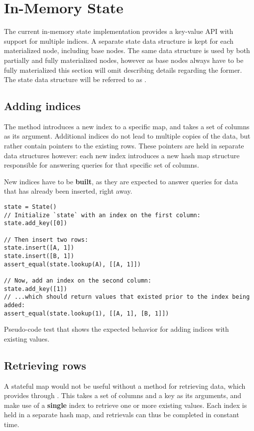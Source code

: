 \section{In-Memory State}\label{sec:in-memory-state}
The current in-memory state implementation provides a key-value API with support
for multiple indices. A separate state data structure is kept for each
materialized node, including base nodes. The same data structure is used by both
partially and fully materialized nodes, however as base nodes always have to be
fully materialized this section will omit describing details regarding the
former. The state data structure will be referred to as .

\subsection{Adding indices}
The  method introduces a new index to a specific  map,
and takes a set of columns as its argument. Additional indices do not lead to
multiple copies of the data, but rather contain pointers to the existing rows.
These pointers are held in separate data structures however: each new index
introduces a new hash map structure responsible for answering queries for that
specific set of columns.

New indices have to be \textbf{built}, as they are expected to answer queries
for data that has already been inserted, right away.

\begin{listing}[H]
  \begin{verbatim}
state = State()
// Initialize `state` with an index on the first column:
state.add_key([0])

// Then insert two rows:
state.insert([A, 1])
state.insert([B, 1])
assert_equal(state.lookup(A), [[A, 1]])

// Now, add an index on the second column:
state.add_key([1])
// ...which should return values that existed prior to the index being added:
assert_equal(state.lookup(1), [[A, 1], [B, 1]])
  \end{verbatim}

  \caption{Pseudo-code test that shows the expected behavior for adding indices
  with existing values.}\label{lst:existing-index}
\end{listing}

\subsection{Retrieving rows}
A stateful map would not be useful without a method for retrieving data, which
 provides through . This takes a set of columns
and a key as its arguments, and make use of a \textbf{single} index to retrieve
one or more existing values. Each index is held in a separate hash map, and
retrievals can thus be completed in constant time.

